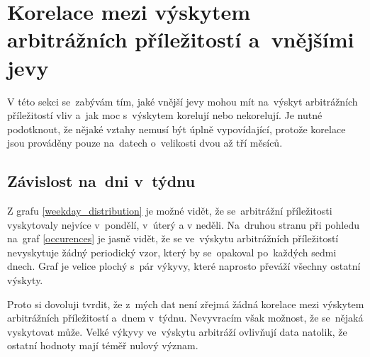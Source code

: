 \documentclass[thesis=B,czech]{FITthesis}[2019/03/21]
\begin{document}
\section{Korelace mezi výskytem arbitrážních příležitostí a~vnějšími jevy}
V této sekci se~zabývám tím, jaké vnější jevy mohou mít na~výskyt arbitrážních příležitostí vliv a~jak moc s~výskytem korelují nebo nekorelují. Je nutné podotknout, že nějaké vztahy nemusí být úplně vypovídající, protože korelace jsou prováděny pouze na~datech o~velikosti dvou až tří měsíců.

\subsection{Závislost na~dni v~týdnu}
Z grafu \ref{weekday_distribution} je možné vidět, že se~arbitrážní příležitosti vyskytovaly nejvíce v~pondělí, v~úterý a v neděli. Na~druhou stranu při pohledu na~graf \ref{occurences} je jasně vidět, že se ve~výskytu arbitrážních příležitostí nevyskytuje žádný periodický vzor, který by se~opakoval po~každých sedmi dnech. Graf je velice plochý s~pár výkyvy, které naprosto převáží všechny ostatní výskyty.

Proto si dovoluji tvrdit, že z~mých dat není zřejmá žádná korelace mezi výskytem arbitrážních příležitostí a~dnem v~týdnu. Nevyvracím však možnost, že se~nějaká vyskytovat může. Velké výkyvy ve~výskytu arbitráží ovlivňují data natolik, že ostatní hodnoty mají téměř nulový význam.
\end{document}
